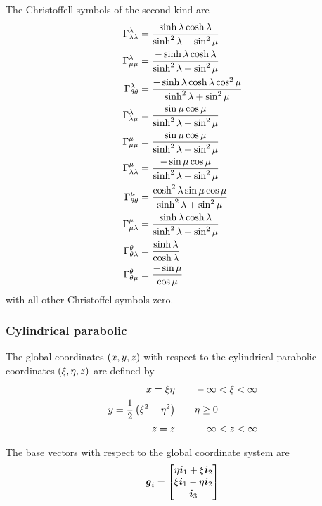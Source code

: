 The Christoffell symbols of the second kind are
\begin{align}
   \Gamma^{\lambda}_{\lambda\lambda} &=\frac{\sinh\lambda\cosh\lambda}{\sinh^{2}\lambda+\sin^{2}\mu} \\
   \Gamma^{\lambda}_{\mu\mu} &=\frac{-\sinh\lambda\cosh\lambda}{\sinh^{2}\lambda+\sin^{2}\mu} \\
   \Gamma^{\lambda}_{\theta\theta} &=\frac{-\sinh\lambda\cosh\lambda\cos^{2}\mu}{\sinh^{2}\lambda+\sin^{2}\mu} \\
   \Gamma^{\lambda}_{\lambda\mu} &=\frac{\sin\mu\cos\mu}{\sinh^{2}\lambda+\sin^{2}\mu} \\
   \Gamma^{\mu}_{\mu\mu} &=\frac{\sin\mu\cos\mu}{\sinh^{2}\lambda+\sin^{2}\mu} \\
   \Gamma^{\mu}_{\lambda\lambda} &=\frac{-\sin\mu\cos\mu}{\sinh^{2}\lambda+\sin^{2}\mu} \\
   \Gamma^{\mu}_{\theta\theta} &=\frac{\cosh^{2}\lambda\sin\mu\cos\mu}{\sinh^{2}\lambda+\sin^{2}\mu} \\
   \Gamma^{\mu}_{\mu\lambda} &=\frac{\sinh\lambda\cosh\lambda}{\sinh^{2}\lambda+\sin^{2}\mu} \\
   \Gamma^{\theta}_{\theta\lambda} &=\frac{\sinh\lambda}{\cosh\lambda} \\
   \Gamma^{\theta}_{\theta\mu} &=\frac{-\sin\mu}{\cos\mu} \\
\end{align}
with all other Christoffel symbols zero.

\subsubsection{Cylindrical parabolic}

The global coordinates $\left( x,y,z \right)$ with respect to the cylindrical parabolic
coordinates $\left( \xi,\eta,z \right)$  are defined by
\begin{equation}
  \begin{aligned}
    x = \xi\eta & \qquad -\infty < \xi < \infty \\
    y = \frac{1}{2}\left( \xi^{2}-\eta^{2} \right) & \qquad \eta \ge 0 \\
    z =  z & \qquad -\infty < z < \infty
  \end{aligned}
\end{equation}

The base vectors with respect to the global coordinate system are
\begin{equation}
  \boldsymbol{g}_{i}=\begin{bmatrix} 
    \eta\boldsymbol{i}_{1}+\xi\boldsymbol{i}_{2}\\
    \xi\boldsymbol{i}_{1}-\eta\boldsymbol{i}_{2}\\    
    \boldsymbol{i}_{3}
  \end{bmatrix}
\end{equation}

